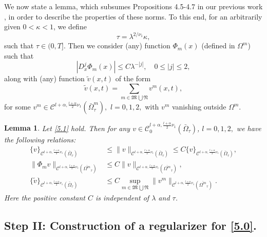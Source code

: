 \documentclass[reqno]{amsart}
\def\C {\mathcal{C}}
\newtheorem{lemma}[proposition]{Lemma}
\theoremstyle{definition}
\numberwithin{equation}{section}
\begin{document}
We now state a lemma,
which subsumes Propositions 4.5-4.7 in our previous work \cite{KPV1},
in order to describe the properties of these norms. To this end, for an arbitrarily given $0<\kappa<1$, we define
\begin{equation}\label{5.1}
\tau=\lambda^{2/\nu_{1}}\kappa,
\end{equation}
such that $\tau\in(0,T]$.
Then we consider (any) function $\Phi_{m}(x)$ (defined in $\Omega^{m}$) such that
\[
|D_{x}^{j}\Phi_{m}(x)|\leq C\lambda^{-|j|},\quad 0\leq |j|\leq 2,
\]
along with (any) function $\tilde{v}(x,t)$ of the form
\[
\tilde{v}(x,t)=\sum_{m\in\mathfrak{M}\,\bigcup\mathfrak{N}}v^{m}(x,t),
\]
for some $v^{m}\in\C^{l+\alpha,\frac{l+\alpha}{2}\nu_{1}}(\bar{\Omega}_{\tau}^{m}),$ $l=0,1,2,$
with $v^{m}$ vanishing outside $\Omega^{m}$.

\begin{lemma}\label{l5.1}
Let \eqref{5.1} hold. Then for any $v\in \C_{0}^{l+\alpha,\frac{l+\alpha}{2}\nu_{1}}(\bar{\Omega}_{\tau})$, $l=0,1,2,$ we have the following relations:
\begin{align*}
\{v\}_{\C^{l+\alpha,\frac{l+\alpha}{2}\nu_{1}}(\bar{\Omega}_{\tau})}&\leq
\|v\|_{\C^{l+\alpha,\frac{l+\alpha}{2}\nu_{1}}(\bar{\Omega}_{\tau})}\leq
C\{v\}_{\C^{l+\alpha,\frac{l+\alpha}{2}\nu_{1}}(\bar{\Omega}_{\tau})},\\
\|\Phi_{m}
v\|_{\C^{l+\alpha,\frac{l+\alpha}{2}\nu_{1}}(\overline{\Omega^{m}}_{\tau})}&\leq
C\|
v\|_{\C^{l+\alpha,\frac{l+\alpha}{2}\nu_{1}}(\overline{\Omega^{m}}_{\tau})},\\
\{\tilde{v}\}_{\C^{l+\alpha,\frac{l+\alpha}{2}\nu_{1}}(\bar{\Omega}_{\tau})}&\leq
C\underset{m\in\mathfrak{M}\,\bigcup\mathfrak{N}}{\sup}\|v^{m}\|_{\C^{l+\alpha,\frac{l+\alpha}{2}\nu_{1}}(\overline{\Omega^{m}}_{\tau})}.
\end{align*}
Here the positive constant $C$ is independent of $\lambda$ and $\tau$.
\end{lemma}



\subsection{Step II: Construction of a regularizer for  \eqref{5.0}.}\label{s5.2}
\end{document}
